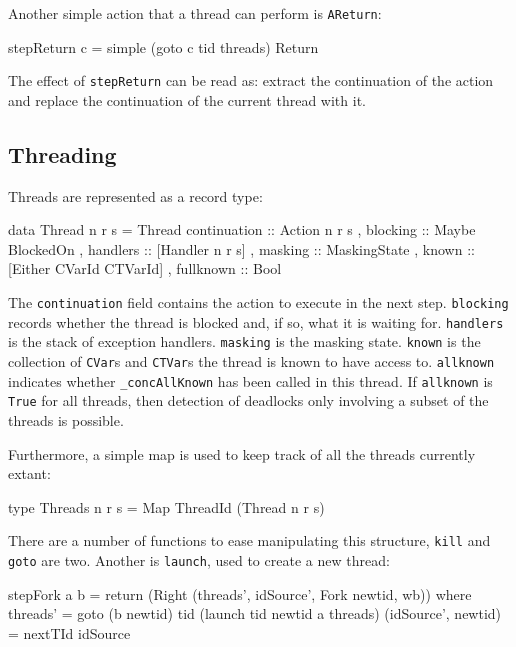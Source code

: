 Another simple action that a thread can perform is \verb|AReturn|:

\begin{haskellcode}
stepReturn c = simple (goto c tid threads) Return
\end{haskellcode}

The effect of \verb|stepReturn| can be read as: extract the
continuation of the action and replace the continuation of the current
thread with it.

\subsection{Threading}
\label{sec:execution-stepwise-threading}

Threads are represented as a record type:

\begin{haskellcode}
data Thread n r s = Thread
  { continuation :: Action n r s
  , blocking     :: Maybe BlockedOn
  , handlers     :: [Handler n r s]
  , masking      :: MaskingState
  , known        :: [Either CVarId CTVarId]
  , fullknown    :: Bool
  }
\end{haskellcode}

The \verb|continuation| field contains the action to execute in the
next step. \verb|blocking| records whether the thread is blocked and,
if so, what it is waiting for. \verb|handlers| is the stack of
exception handlers. \verb|masking| is the masking state. \verb|known|
is the collection of \verb|CVar|s and \verb|CTVar|s the thread is
known to have access to. \verb|allknown| indicates whether
\verb|_concAllKnown| has been called in this thread. If
\verb|allknown| is \verb|True| for all threads, then detection of
deadlocks only involving a subset of the threads is possible.

Furthermore, a simple map is used to keep track of all the threads
currently extant:

\begin{haskellcode}
type Threads n r s = Map ThreadId (Thread n r s)
\end{haskellcode}

There are a number of functions to ease manipulating this structure,
\verb|kill| and \verb|goto| are two. Another is \verb|launch|, used to
create a new thread:

\begin{haskellcode}
stepFork a b = return (Right (threads', idSource', Fork newtid, wb)) where
  threads' = goto (b newtid) tid (launch tid newtid a threads)
  (idSource', newtid) = nextTId idSource
\end{haskellcode}

